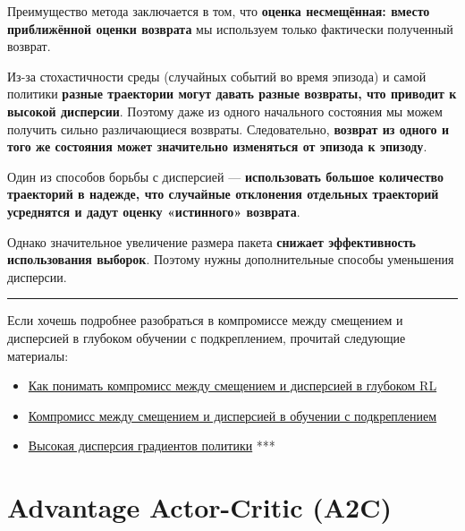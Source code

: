 \documentclass[11pt,a4paper]{article}
\begin{document}
Преимущество метода заключается в том, что \textbf{оценка несмещённая: вместо приближённой оценки возврата} мы используем только фактически полученный возврат.

Из-за стохастичности среды (случайных событий во время эпизода) и самой политики \textbf{разные траектории могут давать разные возвраты, что приводит к высокой дисперсии}. Поэтому даже из одного начального состояния мы можем получить сильно различающиеся возвраты. Следовательно, \textbf{возврат из одного и того же состояния может значительно изменяться от эпизода к эпизоду}.


Один из способов борьбы с дисперсией --- \textbf{использовать большое количество траекторий в надежде, что случайные отклонения отдельных траекторий усреднятся и дадут оценку «истинного» возврата}.

Однако значительное увеличение размера пакета \textbf{снижает эффективность использования выборок}. Поэтому нужны дополнительные способы уменьшения дисперсии.

\begin{center}\rule{0.5\linewidth}{0.5pt}\end{center}

Если хочешь подробнее разобраться в компромиссе между смещением и дисперсией в глубоком обучении с подкреплением, прочитай следующие материалы:

\begin{itemize}
\tightlist
\item
  \href{https://blog.mlreview.com/making-sense-of-the-bias-variance-trade-off-in-deep-reinforcement-learning-79cf1e83d565}{Как понимать компромисс между смещением и дисперсией в глубоком RL}
\item
  \href{https://www.endtoend.ai/blog/bias-variance-tradeoff-in-reinforcement-learning/}{Компромисс между смещением и дисперсией в обучении с подкреплением}
\item
  \href{https://balajiai.github.io/high_variance_in_policy_gradients}{Высокая дисперсия градиентов политики} ***
\end{itemize}

\section{Advantage Actor-Critic (A2C)}\label{advantage-actor-critic-a2c}
\end{document}

